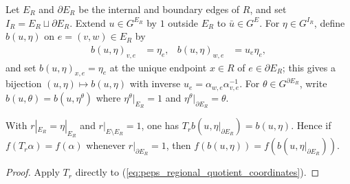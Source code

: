 \begin{definition}%
    \label{def:peps_regional_quotient_coordinates}
    \leanok
    Let $E_R$ and $\partial E_R$ be the internal and boundary edges of $R$, and set $I_R=E_R\sqcup\partial E_R$. Extend $u\in G^{E_R}$ by $1$ outside $E_R$ to $\bar u\in G^E$. For $\eta\in G^{I_R}$, define $b(u,\eta)$ on $e=(v,w)\in E_R$ by
    \begin{align}
        b(u,\eta)_{v,e} & =\eta_e,    &
        b(u,\eta)_{w,e} & =u_e\eta_e,
        \label{eq:peps_regional_quotient_coordinates}
    \end{align}
    and set $b(u,\eta)_{x,e}=\eta_e$ at the unique endpoint $x\in R$ of $e\in\partial E_R$; this gives a bijection $(u,\eta)\mapsto b(u,\eta)$ with inverse $u_e=\alpha_{w,e}\alpha_{v,e}^{-1}$. For $\theta\in G^{\partial E_R}$, write $b(u,\theta)=b(u,\eta^\theta)$ where $\eta^\theta|_{E_R}=1$ and $\eta^\theta|_{\partial E_R}=\theta$.
\end{definition}

\begin{lemma}%
    \label{thm:peps_regional_reference_normalization}
    \leanok
    With $r|_{E_R}=\eta|_{E_R}$ and $r|_{E\setminus E_R}=1$, one has $T_r b(u,\eta|_{\partial E_R})=b(u,\eta)$. Hence if $f(T_r\alpha)=f(\alpha)$ whenever $r|_{\partial E_R}=1$, then $f(b(u,\eta))=f(b(u,\eta|_{\partial E_R}))$.
\end{lemma}
\begin{proof}\leanok
    Apply $T_r$ directly to (\ref{eq:peps_regional_quotient_coordinates}).
\end{proof}

